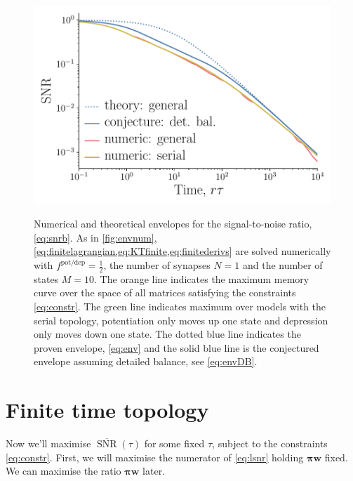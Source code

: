 \documentclass[12pt]{article}
\newcommand{\eqm}{\pi}
\newcommand{\eq}{\boldsymbol{\eqm}}
\newcommand{\wm}{w}
\newcommand{\w}{\mathbf{\wm}}
\newcommand{\potdep}{^{\text{pot/dep}}}
\DeclareMathOperator{\snr}{SNR}
\newcommand{\snrb}{\overline{\snr}}
\begin{document}
\begin{figure}[tb]
  \centering
  \includegraphics[width=0.8\linewidth]{LenvNum.pdf}\\
  \caption[Numerical and theoretical envelopes for the signal-to-noise ratio]
  {Numerical  and theoretical envelopes  for the signal-to-noise ratio, \eqref{eq:snrb}. 
  As in \cref{fig:envnum}, \cref{eq:finitelagrangian,eq:KTfinite,eq:finitederivs} 
  are solved numerically with \(f\potdep=\frac{1}{2}\), 
  the number of synapses \(N=1\) and the number of states \(M=10\).
  The orange line indicates the maximum memory curve over the space of all matrices 
  satisfying the constraints \eqref{eq:constr}.
  The green line indicates maximum over models with the serial topology, 
  \ie potentiation only moves up one state and depression only moves down one state.
  The dotted blue line indicates the proven envelope, 
  \cref{eq:env} and the solid blue line is the conjectured envelope assuming detailed balance, 
  see \cref{eq:envDB}.}\label{fig:envnumth}
\end{figure}


\section{Finite time topology}\label{sec:finite}

Now we'll maximise \(\snrb(\tau)\) for some fixed \(\tau\), subject to the constraints \eqref{eq:constr}.
First, we will maximise the numerator of \eqref{eq:lsnr} holding \(\eq\w\) fixed.
We can maximise the ratio \wrt \(\eq\w\) later.
\end{document}

